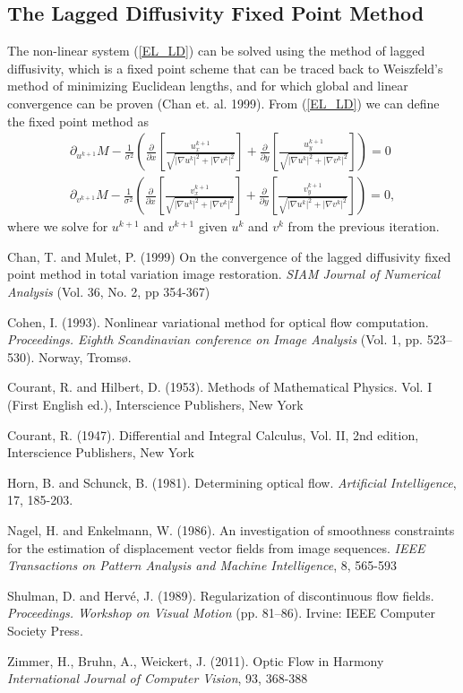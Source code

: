 \documentclass[10pt,a4paper]{article}
\begin{document}
\subsection{The Lagged Diffusivity Fixed Point Method}
The non-linear system (\ref{EL_LD}) can be solved using the method of lagged diffusivity, which is a fixed point scheme that can be traced back to Weiszfeld's method of minimizing Euclidean lengths, and for which global and linear convergence can be proven (Chan et. al. 1999). From (\ref{EL_LD}) we can define the fixed point method as
\begin{align*}
\partial_{u^{k+1}} M - \frac{1}{\sigma^2} \left(\frac{\partial}{\partial x}\left[ \frac{u^{k+1}_x}{\sqrt{|\nabla u^k|^2 + |\nabla v^k|^2}} \right] + \frac{\partial}{\partial y} \left[ \frac{u^{k+1}_y}{\sqrt{|\nabla u^k|^2 + |\nabla v^k|^2}} \right] \right) = 0 \\
\partial_{v^{k+1}} M - \frac{1}{\sigma^2} \left(\frac{\partial}{\partial x}\left[ \frac{v^{k+1}_x}{\sqrt{|\nabla u^k|^2 + |\nabla v^k|^2}} \right] + \frac{\partial}{\partial y} \left[ \frac{v^{k+1}_y}{\sqrt{|\nabla u^k|^2 + |\nabla v^k|^2}} \right] \right) = 0,
\end{align*}
where we solve for $u^{k+1}$ and $v^{k+1}$ given $u^k$ and $v^k$ from the previous iteration.


\begin{thebibliography}{}

Chan, T. and Mulet, P. (1999) On the convergence of the lagged diffusivity fixed point method in total variation image restoration. \emph{SIAM Journal of Numerical Analysis} (Vol. 36, No. 2, pp 354-367)

Cohen, I. (1993). Nonlinear variational method for optical flow computation. \emph{Proceedings. Eighth Scandinavian conference on Image Analysis} (Vol. 1, pp. 523–530). Norway, Tromsø.

Courant, R. and Hilbert, D. (1953). Methods of Mathematical Physics. Vol. I (First English ed.), Interscience Publishers, New York

Courant, R. (1947). Differential and Integral Calculus, Vol. II, 2nd edition, Interscience Publishers, New York


Horn, B. and Schunck, B. (1981). Determining optical flow. \emph{Artificial Intelligence}, 17, 185-203.

Nagel, H. and Enkelmann, W. (1986). An investigation of smoothness constraints for the estimation of displacement vector fields from image sequences. \emph{IEEE Transactions on Pattern Analysis and Machine Intelligence}, 8, 565-593

Shulman, D. and Hervé, J. (1989). Regularization of discontinuous flow fields. \emph{Proceedings. Workshop on Visual Motion} (pp. 81–86). Irvine: IEEE Computer Society Press.

Zimmer, H., Bruhn, A., Weickert, J. (2011). Optic Flow in Harmony \emph{International Journal of Computer Vision}, 93, 368-388


\end{thebibliography}
\end{document}
